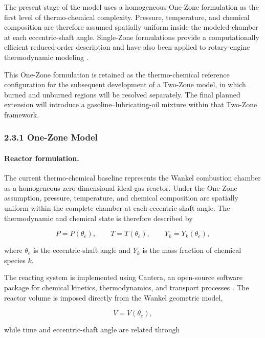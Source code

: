 \documentclass[man,floatsintext,noextraspace]{apa6}
\begin{document}
The present stage of the model uses a homogeneous One-Zone formulation as the first level of thermo-chemical complexity. Pressure, temperature, and chemical composition are therefore assumed spatially uniform inside the modeled chamber at each eccentric-shaft angle. Single-Zone formulations provide a computationally efficient reduced-order description and have also been applied to rotary-engine
thermodynamic modeling \cite{Yang2022}.

This One-Zone formulation is retained as the thermo-chemical reference
configuration for the subsequent development of a Two-Zone model, in which burned and unburned regions will be resolved separately. The final planned extension will introduce a gasoline--lubricating-oil mixture within that Two-Zone framework.

\subsubsection{2.3.1 One-Zone Model}

\paragraph{Reactor formulation.}

The current thermo-chemical baseline represents the Wankel combustion chamber as a homogeneous zero-dimensional ideal-gas reactor. Under the One-Zone assumption, pressure, temperature, and chemical composition are spatially uniform within the complete chamber at each eccentric-shaft angle. The thermodynamic and chemical state is therefore described by

\begin{equation}
P=P(\theta_e), \qquad
T=T(\theta_e), \qquad
Y_k=Y_k(\theta_e),
\end{equation}

where $\theta_e$ is the eccentric-shaft angle and $Y_k$ is the mass fraction of chemical species $k$.

The reacting system is implemented using Cantera, an open-source software package for chemical kinetics, thermodynamics, and transport processes \cite{Cantera2025}. The reactor volume is imposed directly from the Wankel geometric model,

\begin{equation}
V=V(\theta_e),
\end{equation}

while time and eccentric-shaft angle are related through
\end{document}
